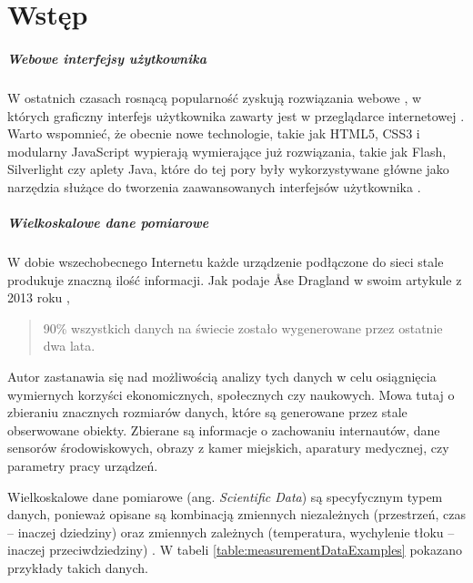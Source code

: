 \chapter{Wstęp}

\paragraph{Webowe interfejsy użytkownika}

W ostatnich czasach rosnącą popularność zyskują rozwiązania webowe \cite{dziennik-internautow}, w których graficzny interfejs użytkownika zawarty jest w przeglądarce internetowej \cite{what-is-web-app}. Warto wspomnieć, że obecnie nowe technologie, takie jak HTML5, CSS3 i modularny JavaScript wypierają wymierające już rozwiązania, takie jak Flash, Silverlight czy aplety Java, które do tej pory były wykorzystywane główne jako narzędzia  służące do tworzenia zaawansowanych interfejsów użytkownika \cite{jobs2010thoughts}.

\paragraph{Wielkoskalowe dane pomiarowe}

W dobie wszechobecnego Internetu każde urządzenie podłączone do sieci stale produkuje znaczną ilość informacji. 
Jak podaje Åse Dragland w swoim artykule z 2013 roku \cite{dragland2013big},
\begin{quote}
	90\% wszystkich danych na świecie zostało wygenerowane przez ostatnie dwa lata.
\end{quote}
Autor zastanawia się nad możliwością analizy tych danych w celu osiągnięcia wymiernych korzyści ekonomicznych, społecznych czy naukowych.
Mowa tutaj o zbieraniu znacznych rozmiarów danych, które są generowane przez stale obserwowane obiekty. Zbierane są informacje o zachowaniu internautów, dane sensorów środowiskowych, obrazy z kamer miejskich, aparatury medycznej, czy parametry pracy urządzeń.



Wielkoskalowe dane pomiarowe (ang. \textit{Scientific Data}) są specyfycznym typem danych, ponieważ opisane są kombinacją zmiennych niezależnych (przestrzeń, czas -- inaczej dziedziny) oraz zmiennych zależnych (temperatura, wychylenie tłoku -- inaczej przeciwdziedziny) \cite{Hauser12VisTutorial}. W tabeli \ref{table:measurementDataExamples} pokazano przykłady takich danych.



